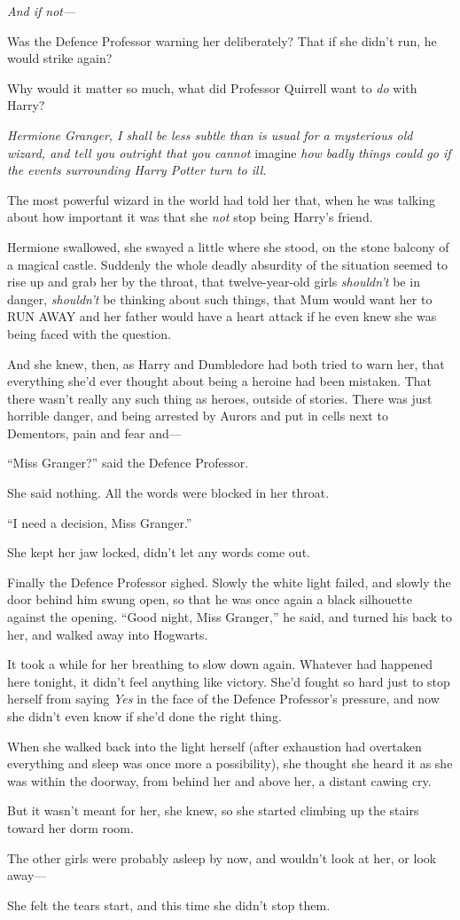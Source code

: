 \emph{And if not---}

Was the Defence Professor warning her deliberately? That if she didn't
run, he would strike again?

Why would it matter so much, what did Professor Quirrell want to
\emph{do} with Harry?

\emph{Hermione Granger, I shall be less subtle than is usual for a
mysterious old wizard, and tell you outright that you cannot} imagine
\emph{how badly things could go if the events surrounding Harry Potter
turn to ill.}

The most powerful wizard in the world had told her that, when he was
talking about how important it was that she \emph{not} stop being
Harry's friend.

Hermione swallowed, she swayed a little where she stood, on the stone
balcony of a magical castle. Suddenly the whole deadly absurdity of the
situation seemed to rise up and grab her by the throat, that
twelve-year-old girls \emph{shouldn't} be in danger, \emph{shouldn't} be
thinking about such things, that Mum would want her to RUN AWAY and her
father would have a heart attack if he even knew she was being faced
with the question.

And she knew, then, as Harry and Dumbledore had both tried to warn her,
that everything she'd ever thought about being a heroine had been
mistaken. That there wasn't really any such thing as heroes, outside of
stories. There was just horrible danger, and being arrested by Aurors
and put in cells next to Dementors, pain and fear and---

``Miss Granger?'' said the Defence Professor.

She said nothing. All the words were blocked in her throat.

``I need a decision, Miss Granger.''

She kept her jaw locked, didn't let any words come out.

Finally the Defence Professor sighed. Slowly the white light failed, and
slowly the door behind him swung open, so that he was once again a black
silhouette against the opening. ``Good night, Miss Granger,'' he said,
and turned his back to her, and walked away into Hogwarts.

It took a while for her breathing to slow down again. Whatever had
happened here tonight, it didn't feel anything like victory. She'd
fought so hard just to stop herself from saying \emph{Yes} in the face
of the Defence Professor's pressure, and now she didn't even know if
she'd done the right thing.

When she walked back into the light herself (after exhaustion had
overtaken everything and sleep was once more a possibility), she thought
she heard it as she was within the doorway, from behind her and above
her, a distant cawing cry.

But it wasn't meant for her, she knew, so she started climbing up the
stairs toward her dorm room.

The other girls were probably asleep by now, and wouldn't look at her,
or look away---

She felt the tears start, and this time she didn't stop them.
